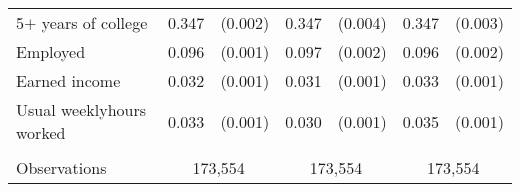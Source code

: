 \begin{tabular}{lcccccc}
 \hspace{0.3cm} 5$+$ years of college  & 0.347 & (0.002)  & 0.347 & (0.004)  & 0.347 & (0.003)  \\
 Employed  & 0.096 & (0.001)  & 0.097 & (0.002)  & 0.096 & (0.002)  \\
 Earned income  & 0.032 & (0.001)  & 0.031 & (0.001)  & 0.033 & (0.001)  \\
 Usual weeklyhours worked  & 0.033 & (0.001)  & 0.030 & (0.001)  & 0.035 & (0.001)  \\
\\
Observations & \multicolumn{2}{c}{173,554} & \multicolumn{2}{c}{173,554} & \multicolumn{2}{c}{173,554} \\
\bottomrule
\bottomrule
\end{tabular}
